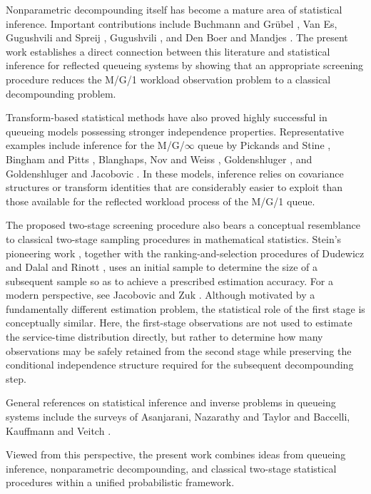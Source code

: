 \documentclass[12pt]{article}
\newcommand{\1}{\mathbf{1}}
\begin{document}
Nonparametric decompounding itself has become a mature area of statistical
inference. Important contributions include Buchmann and Grübel
\cite{Buchmann2003}, Van Es, Gugushvili and Spreij \cite{Van Es2007},
Gugushvili \cite{Gugushvili2012}, and Den Boer and Mandjes
\cite{Den Boer2017}. The present work establishes a direct connection between
this literature and statistical inference for reflected queueing systems by
showing that an appropriate screening procedure reduces the M/G/1 workload
observation problem to a classical decompounding problem.

Transform-based statistical methods have also proved highly successful in
queueing models possessing stronger independence properties. Representative
examples include inference for the M/G/$\infty$ queue by Pickands and Stine
\cite{Pickands1997}, Bingham and Pitts \cite{Bingham1999}, Blanghaps, Nov and
Weiss \cite{Blanghaps2013}, Goldenshluger
\cite{Goldenshluger2016,Goldenshluger2018}, and Goldenshluger and Jacobovic
\cite{Goldenshluger2024}. In these models, inference relies on covariance
structures or transform identities that are considerably easier to exploit than
those available for the reflected workload process of the M/G/1 queue.

The proposed two-stage screening procedure also bears a conceptual resemblance
to classical two-stage sampling procedures in mathematical statistics.
Stein's pioneering work \cite{Stein1945}, together with the ranking-and-selection
procedures of Dudewicz and Dalal \cite{Dudewicz1975} and Rinott
\cite{Rinott1978}, uses an initial sample to determine the size of a subsequent
sample so as to achieve a prescribed estimation accuracy. For a modern
perspective, see Jacobovic and Zuk \cite{Jacobovic2017}. Although motivated by
a fundamentally different estimation problem, the statistical role of the first
stage is conceptually similar. Here, the first-stage observations are not used
to estimate the service-time distribution directly, but rather to determine how
many observations may be safely retained from the second stage while preserving
the conditional independence structure required for the subsequent
decompounding step.

General references on statistical inference and inverse problems in queueing
systems include the surveys of Asanjarani, Nazarathy and Taylor
\cite{Asanjarani2021} and Baccelli, Kauffmann and Veitch
\cite{Baccelli2009}.

Viewed from this perspective, the present work combines ideas from queueing
inference, nonparametric decompounding, and classical two-stage statistical
procedures within a unified probabilistic framework.
\end{document}
